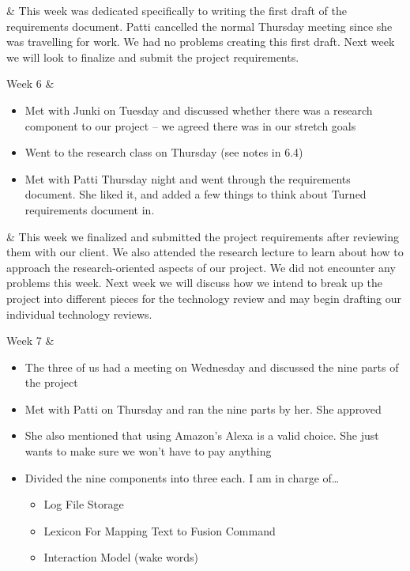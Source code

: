 \documentclass[onecolumn, draftclsnofoot,10pt, compsoc]{IEEEtran}
\begin{document}
\begin{center}
\begin{longtabu}
			&
			{
				This week was dedicated specifically to writing the first draft of the requirements document.
				Patti cancelled the normal Thursday meeting since she was travelling for work.
				We had no problems creating this first draft.
				Next week we will look to finalize and submit the project requirements.	
			}
			\\ \hline
			
			Week 6 
			&
			{
				\begin{itemize}
					\item Met with Junki on Tuesday and discussed whether there was a research component to our project -- we agreed there was in our stretch goals
					\item Went to the research class on Thursday (see notes in 6.4)
					\item Met with Patti Thursday night and went through the requirements document. She liked it, and added a few things to think about 
					Turned requirements document in.
				\end{itemize}
			}
			
			&
			{
				This week we finalized and submitted the project requirements after reviewing them with our client.
				We also attended the research lecture to learn about how to approach the research-oriented aspects of our project.
				We did not encounter any problems this week.
				Next week we will discuss how we intend to break up the project into different pieces for the technology review and may begin drafting our individual technology reviews.	
			}
			\\ \hline
			
			Week 7 
			&
			{
					\begin{itemize}
						\item The three of us had a meeting on Wednesday and discussed the nine parts of the project
						\item Met with Patti on Thursday and ran the nine parts by her. She approved
						\item She also mentioned that using Amazon's Alexa is a valid choice. She just wants to make sure we won't have to pay anything
						\item Divided the nine components into three each. I am in charge of…
						 \begin{itemize}
						 	\item Log File Storage
						 	\item Lexicon For Mapping Text to Fusion Command
						 	\item Interaction Model (wake words)
						 \end{itemize}
					\end{itemize}
			}
			

\end{longtabu}
\end{center}
\end{document}
